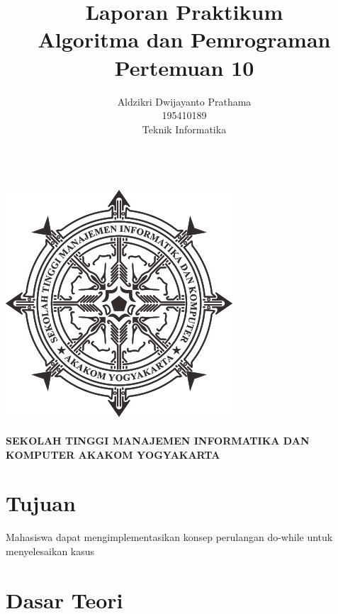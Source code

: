\documentclass[a4paper,12pt]{article}
\begin{document}
\title{ {\Large Laporan Praktikum}\\ Algoritma dan Pemrograman \\{\Large Pertemuan 10}}

\author{Aldzikri Dwijayanto Prathama 
	\\195410189
	\\Teknik Informatika}
\makeatletter
\begin{titlepage}
	\begin{center}
		{\huge \bfseries \@title }\\[14ex]
		\includegraphics[scale=.8]{logo}\\[4ex]
		{\large \@author}\\[19ex]
		{\large \bfseries {SEKOLAH TINGGI MANAJEMEN INFORMATIKA DAN KOMPUTER
				AKAKOM YOGYAKARTA}}
	\end{center}


\end{titlepage}
\makeatother
\newpage
\tableofcontents
\newpage

\section{Tujuan}
Mahasiswa dapat mengimplementasikan konsep perulangan do-while untuk menyelesaikan kasus

\section{Dasar Teori}
\end{document}
